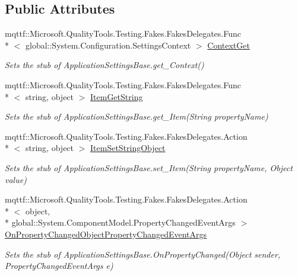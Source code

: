 \subsection*{Public Attributes}
\begin{DoxyCompactItemize}
\item 
mqttf\-::\-Microsoft.\-Quality\-Tools.\-Testing.\-Fakes.\-Fakes\-Delegates.\-Func\\*
$<$ global\-::\-System.\-Configuration.\-Settings\-Context $>$ \hyperlink{class_system_1_1_configuration_1_1_fakes_1_1_stub_application_settings_base_ae4385141162d1f5478e86fe0d383a5bb}{Context\-Get}
\begin{DoxyCompactList}\small\item\em Sets the stub of Application\-Settings\-Base.\-get\-\_\-\-Context()\end{DoxyCompactList}\item 
mqttf\-::\-Microsoft.\-Quality\-Tools.\-Testing.\-Fakes.\-Fakes\-Delegates.\-Func\\*
$<$ string, object $>$ \hyperlink{class_system_1_1_configuration_1_1_fakes_1_1_stub_application_settings_base_a1247b79fb6324a0b76c3d733f56b0f4e}{Item\-Get\-String}
\begin{DoxyCompactList}\small\item\em Sets the stub of Application\-Settings\-Base.\-get\-\_\-\-Item(\-String property\-Name)\end{DoxyCompactList}\item 
mqttf\-::\-Microsoft.\-Quality\-Tools.\-Testing.\-Fakes.\-Fakes\-Delegates.\-Action\\*
$<$ string, object $>$ \hyperlink{class_system_1_1_configuration_1_1_fakes_1_1_stub_application_settings_base_a6901a7dd314c4ddcb2c8aa043847088d}{Item\-Set\-String\-Object}
\begin{DoxyCompactList}\small\item\em Sets the stub of Application\-Settings\-Base.\-set\-\_\-\-Item(\-String property\-Name, Object value)\end{DoxyCompactList}\item 
mqttf\-::\-Microsoft.\-Quality\-Tools.\-Testing.\-Fakes.\-Fakes\-Delegates.\-Action\\*
$<$ object, \\*
global\-::\-System.\-Component\-Model.\-Property\-Changed\-Event\-Args $>$ \hyperlink{class_system_1_1_configuration_1_1_fakes_1_1_stub_application_settings_base_a79810767abd2f697e09551329e8d1b80}{On\-Property\-Changed\-Object\-Property\-Changed\-Event\-Args}
\begin{DoxyCompactList}\small\item\em Sets the stub of Application\-Settings\-Base.\-On\-Property\-Changed(\-Object sender, Property\-Changed\-Event\-Args e)\end{DoxyCompactList}\item 

\end{DoxyCompactItemize}
